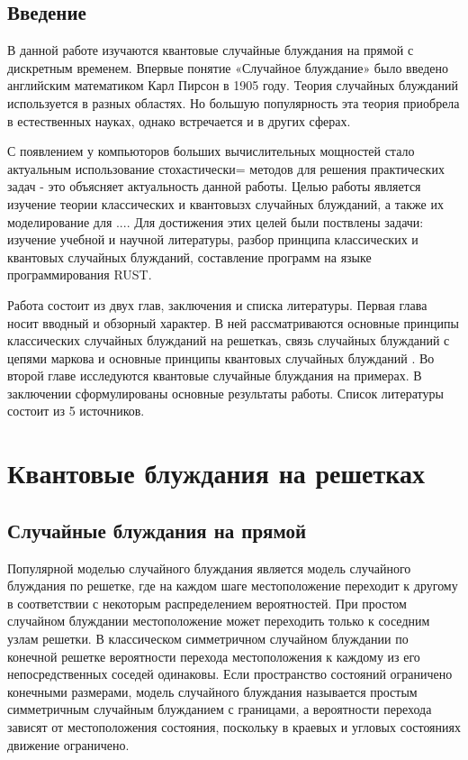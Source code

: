\documentclass[a4paper]{report}
\begin{document}


\section*{Введение}

В данной работе изучаются квантовые случайные блуждания на прямой с дискретным временем.
Впервые понятие «Случайное блуждание» было введено английским математиком Карл Пирсон в 1905 году.
Теория случайных блужданий используется в разных областях. Но большую популярность эта теория приобрела в естественных науках, однако встречается и в других сферах.

С появлением у компьюторов больших вычислительных мощностей стало актуальным использование стохастически= методов для решения практических задач -
это объясняет актуальность данной работы. Целью работы является изучение теории классических и квантовызх случайных блужданий, а также их моделирование для .... Для достижения этих целей были поствлены задачи: изучение учебной и научной литературы, разбор принципа классических и квантовых случайных блужданий, составление программ на языке программирования RUST.

Работа состоит из двух глав, заключения и списка литературы. Первая глава носит вводный и обзорный характер. В ней рассматриваются основные принципы классических случайных блужданий на решеткаъ,  связь случайных блужданий с цепями маркова и основные принципы  квантовых случайных блужданий . Во второй главе исследуются квантовые случайные блуждания на примерах. В заключении сформулированы основные результаты работы. Список литературы состоит из 5 источников.



\chapter{Квантовые блуждания на решетках}


\section{Случайные блуждания на прямой}

Популярной моделью случайного блуждания является модель случайного блуждания по решетке, где на каждом шаге местоположение переходит к другому в соответствии с некоторым распределением вероятностей. При простом случайном блуждании местоположение может переходить только к соседним узлам решетки. В классическом симметричном случайном блуждании по конечной решетке вероятности перехода местоположения к каждому из его непосредственных соседей одинаковы. Если пространство состояний ограничено конечными размерами, модель случайного блуждания называется простым симметричным случайным блужданием с границами, а вероятности перехода зависят от местоположения состояния, поскольку в краевых и угловых состояниях движение ограничено.
\end{document}
